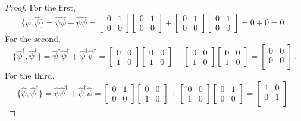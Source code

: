     \begin{proof}
        For the first, 
        \begin{equation*}
            \{\hat \psi, \hat \psi\} = \hat \psi \hat \psi + \hat \psi \hat \psi = \begin{bmatrix} 0 & 1 \\ 0 & 0 \end{bmatrix} \begin{bmatrix} 0 & 1 \\ 0 & 0 \end{bmatrix} + \begin{bmatrix} 0 & 1 \\ 0 & 0 \end{bmatrix} \begin{bmatrix} 0 & 1 \\ 0 & 0 \end{bmatrix} = 0 + 0 = 0 ~.
        \end{equation*}
        For the second, 
        \begin{equation*}
            \{\hat \psi^\dagger, \hat \psi^\dagger \} = \hat \psi^\dagger \hat \psi^\dagger + \hat \psi^\dagger \hat \psi^\dagger = \begin{bmatrix} 0 & 0 \\ 1 & 0 \end{bmatrix} \begin{bmatrix} 0 & 0 \\ 1 & 0 \end{bmatrix} + \begin{bmatrix} 0 & 0 \\ 1 & 0\end{bmatrix} \begin{bmatrix} 0 & 0 \\ 1 & 0 \end{bmatrix} = \begin{bmatrix}
                0 & 0 \\ 0 & 0 \\
            \end{bmatrix} ~.
        \end{equation*}
        For the third, 
        \begin{equation*}
            \{\hat \psi, \hat \psi^\dagger \} = \hat \psi \hat \psi^\dagger + \hat \psi^\dagger \hat \psi = \begin{bmatrix} 0 & 1 \\ 0 & 0 \end{bmatrix} \begin{bmatrix} 0 & 0 \\ 1 & 0 \end{bmatrix} + \begin{bmatrix} 0 & 0 \\ 1 & 0\end{bmatrix} \begin{bmatrix} 0 & 1 \\ 0 & 0 \end{bmatrix} = \begin{bmatrix}
                1 & 0 \\ 0 & 1 \\
            \end{bmatrix} ~.
        \end{equation*}
    \end{proof}
